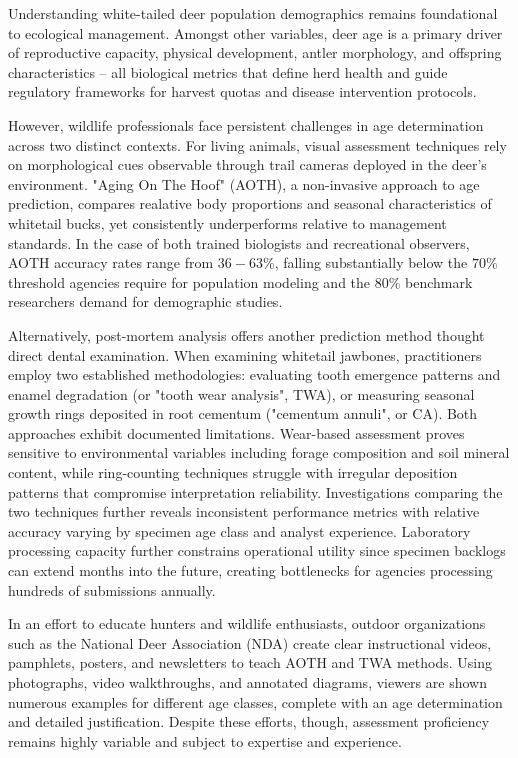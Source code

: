 \documentclass{iopjournal}
\begin{document}
Understanding white-tailed deer population demographics remains foundational to ecological management. Amongst other variables, deer age is a primary driver of reproductive capacity, physical development, antler morphology, and offspring characteristics -- all biological metrics that define herd health and guide regulatory frameworks for harvest quotas and disease intervention protocols.

However, wildlife professionals face persistent challenges in age determination across two distinct contexts. For living animals, visual assessment techniques rely on morphological cues observable through trail cameras deployed in the deer's environment. "Aging On The Hoof" (AOTH), a non-invasive approach to age prediction, compares realative body proportions and seasonal characteristics of whitetail bucks, yet consistently underperforms relative to management standards. In the case of both trained biologists and recreational observers, AOTH accuracy rates range from $36-63\%$, falling substantially below the $70\%$ threshold agencies require for population modeling and the $80\%$ benchmark researchers demand for demographic studies.

Alternatively, post-mortem analysis offers another prediction method thought direct dental examination. When examining whitetail jawbones, practitioners employ two established methodologies: evaluating tooth emergence patterns and enamel degradation (or "tooth wear analysis", TWA), or measuring seasonal growth rings deposited in root cementum ("cementum annuli", or CA). Both approaches exhibit documented limitations. Wear-based assessment proves sensitive to environmental variables including forage composition and soil mineral content, while ring-counting techniques struggle with irregular deposition patterns that compromise interpretation reliability. Investigations comparing the two techniques further reveals inconsistent performance metrics with relative accuracy varying by specimen age class and analyst experience. Laboratory processing capacity further constrains operational utility since specimen backlogs can extend months into the future, creating bottlenecks for agencies processing hundreds of submissions annually.

In an effort to educate hunters and wildlife enthusiasts, outdoor organizations such as the National Deer Association (NDA) create clear instructional videos, pamphlets, posters, and newsletters to teach AOTH and TWA methods. Using photographs, video walkthroughs, and annotated diagrams, viewers are shown numerous examples for different age classes, complete with an age determination and detailed justification. Despite these efforts, though, assessment proficiency remains highly variable and subject to expertise and experience.
\end{document}
